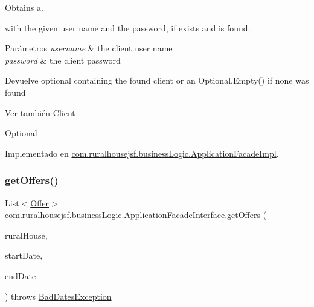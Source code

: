Obtains a. 


\begin{DoxyCode}{0}
\end{DoxyCode}
 with the given user name and the password, if exists and is found.


\begin{DoxyParams}{Parámetros}
{\em username} & the client user name \\
\hline
{\em password} & the client password\\
\hline
\end{DoxyParams}
\begin{DoxyReturn}{Devuelve}
optional containing the found client or an {\ttfamily Optional.\+Empty()} if none was found
\end{DoxyReturn}
\begin{DoxySeeAlso}{Ver también}
Client 

Optional 
\end{DoxySeeAlso}


Implementado en \mbox{\hyperlink{a00132_a249a902aa3507a04fb15ab5fcf1f082c}{com.\+ruralhousejsf.\+business\+Logic.\+Application\+Facade\+Impl}}.

\mbox{\label{a00136_a31b31b351fd53d7eabe3346b043dc744}} 
\subsubsection{\texorpdfstring{getOffers()}{getOffers()}\hspace{0.1cm}{\footnotesize\ttfamily [1/2]}}
{\footnotesize\ttfamily List$<$\mbox{\hyperlink{a00184}{Offer}}$>$ com.\+ruralhousejsf.\+business\+Logic.\+Application\+Facade\+Interface.\+get\+Offers (\begin{DoxyParamCaption}\item[{\mbox{\hyperlink{a00188}{Rural\+House}}}]{rural\+House,  }\item[{Local\+Date}]{start\+Date,  }\item[{Local\+Date}]{end\+Date }\end{DoxyParamCaption}) throws \mbox{\hyperlink{a00208}{Bad\+Dates\+Exception}}}



